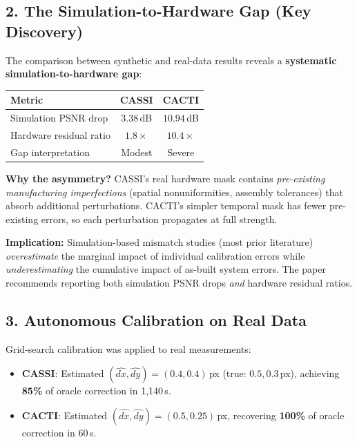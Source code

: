 \documentclass[11pt]{article}
\begin{document}
\subsection*{2. The Simulation-to-Hardware Gap (Key Discovery)}

The comparison between synthetic and real-data results reveals a \textbf{systematic simulation-to-hardware gap}:

\begin{center}
\begin{tabular}{lcc}
\toprule
\textbf{Metric} & \textbf{CASSI} & \textbf{CACTI} \\
\midrule
Simulation PSNR drop & $3.38$\,dB & $10.94$\,dB \\
Hardware residual ratio & $1.8\times$ & $10.4\times$ \\
Gap interpretation & \textcolor{pwmgreen}{Modest} & \textcolor{pwmred}{Severe} \\
\bottomrule
\end{tabular}
\end{center}

\noindent\textbf{Why the asymmetry?}  CASSI's real hardware mask contains \emph{pre-existing manufacturing imperfections} (spatial nonuniformities, assembly tolerances) that absorb additional perturbations.  CACTI's simpler temporal mask has fewer pre-existing errors, so each perturbation propagates at full strength.

\textbf{Implication:} Simulation-based mismatch studies (most prior literature) \emph{overestimate} the marginal impact of individual calibration errors while \emph{underestimating} the cumulative impact of as-built system errors.  The paper recommends reporting both simulation PSNR drops \emph{and} hardware residual ratios.

\subsection*{3. Autonomous Calibration on Real Data}

Grid-search calibration was applied to real measurements:

\begin{itemize}
  \item \textbf{CASSI}: Estimated $(\hat{dx}, \hat{dy}) = (0.4, 0.4)$\,px (true: $0.5, 0.3$\,px), achieving \textbf{85\%} of oracle correction in 1,140\,s.
  \item \textbf{CACTI}: Estimated $(\hat{dx}, \hat{dy}) = (0.5, 0.25)$\,px, recovering \textbf{100\%} of oracle correction in 60\,s.
\end{itemize}
\end{document}
